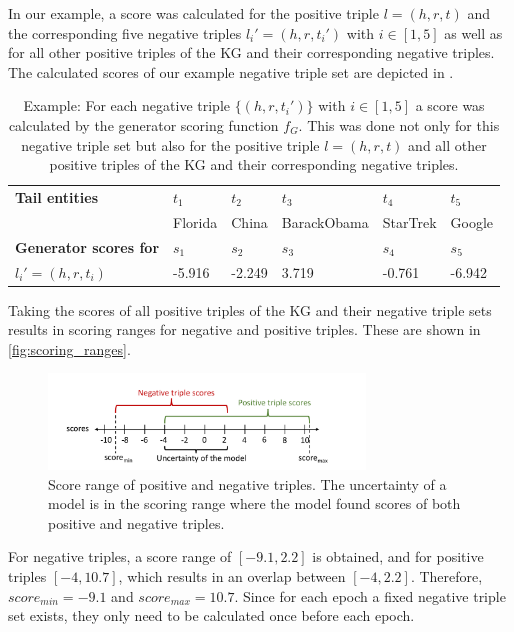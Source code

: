 In our example, a score was calculated for the positive triple $l = (h,r,t)$ and the corresponding five negative triples $l_i' = (h,r,t_i')$  with $i \in [1,5]$ as well as for all other positive triples of the \ac{KG} and their corresponding negative triples.
The calculated scores of our example negative triple set are depicted in .
\begin{table}[h]
    \centering
    \begin{tabular}{llllll}
        \toprule
        
        \textbf{Tail entities}
        & \textbf{$t_1$} & \textbf{$t_2$} & \textbf{$t_3$} & \textbf{$t_4$} & \textbf{$t_5$} \\
         
        & Florida
        & China
        & BarackObama
        & StarTrek
        & Google  \\

        \midrule
        
        \textbf{Generator scores for}
        & $s_1$ & $s_2$ & $s_3$ & $s_4$ & $s_5$ \\
       
        
        \textbf{$l_i' = (h, r, t_i)$}
        & -5.916 
        & -2.249  
        & 3.719 
        & -0.761 
        & -6.942\\ 
        
        \bottomrule
        
    \end{tabular}
    \caption{Example: For each negative triple
    $\{(h,r,t_i')\}$ with $i \in [1,5]$ a score was calculated by the generator scoring function $f_G$.
    This was done not only for this negative triple set but also for the positive triple $l = (h,r,t)$ and all other positive triples of the KG and their corresponding negative triples.}
\label{tab:generator_scores_of_neg}
\end{table}
Taking the scores of all positive triples of the \ac{KG} and their negative triple sets results in scoring ranges for negative and positive triples.
These are shown in \autoref{fig:scoring_ranges}.
\clearpage
\begin{figure}[H]
  \centering
    \includegraphics[width=0.75\textwidth]{figures/scoremin_scoremax_example.pdf}
  \caption{Score range of positive and negative triples.
  The uncertainty of a model is in the scoring range where the model found scores of both positive and negative triples.}
  \label{fig:scoring_ranges}
\end{figure}
For negative triples, a score range of $[-9.1, 2.2]$ is obtained, and for positive triples $[-4, 10.7]$, which results in an overlap between $[-4, 2.2]$.
Therefore, $score_{min} = -9.1$ and $score_{max} = 10.7$.
Since for each epoch a fixed negative triple set exists, they only need to be calculated once before each epoch.